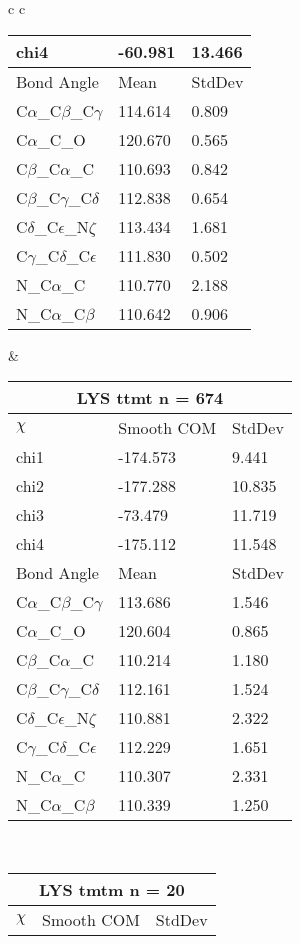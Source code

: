 \begin{longtable}{ c c }
\begin{tabular}{ l l l }
  chi4 & -60.981 & 13.466 \\ \midrule
  Bond Angle   & Mean     & StdDev \\ \midrule
  C$\alpha$\_C$\beta$\_C$\gamma$ & 114.614 & 0.809\\
  C$\alpha$\_C\_O & 120.670 & 0.565\\
  C$\beta$\_C$\alpha$\_C & 110.693 & 0.842\\
  C$\beta$\_C$\gamma$\_C$\delta$ & 112.838 & 0.654\\
  C$\delta$\_C$\epsilon$\_N$\zeta$ & 113.434 & 1.681\\
  C$\gamma$\_C$\delta$\_C$\epsilon$ & 111.830 & 0.502\\
  N\_C$\alpha$\_C & 110.770 & 2.188\\
  N\_C$\alpha$\_C$\beta$ & 110.642 & 0.906\\
  \bottomrule
  \end{tabular}
  &
  \begin{tabular}{ l l l }
  \toprule
  \multicolumn{3}{c}{LYS \textbf{ttmt} n = 674} \\ \toprule
  $\chi$       & Smooth COM & StdDev \\ \midrule
  chi1 & -174.573 & 9.441 \\ 
  chi2 & -177.288 & 10.835 \\ 
  chi3 & -73.479 & 11.719 \\ 
  chi4 & -175.112 & 11.548 \\ \midrule
  Bond Angle   & Mean     & StdDev \\ \midrule
  C$\alpha$\_C$\beta$\_C$\gamma$ & 113.686 & 1.546\\
  C$\alpha$\_C\_O & 120.604 & 0.865\\
  C$\beta$\_C$\alpha$\_C & 110.214 & 1.180\\
  C$\beta$\_C$\gamma$\_C$\delta$ & 112.161 & 1.524\\
  C$\delta$\_C$\epsilon$\_N$\zeta$ & 110.881 & 2.322\\
  C$\gamma$\_C$\delta$\_C$\epsilon$ & 112.229 & 1.651\\
  N\_C$\alpha$\_C & 110.307 & 2.331\\
  N\_C$\alpha$\_C$\beta$ & 110.339 & 1.250\\
  \bottomrule
  \end{tabular}
  \\
  \begin{tabular}{ l l l }
  \toprule
  \multicolumn{3}{c}{LYS \textbf{tmtm} n = 20} \\ \toprule
  $\chi$       & Smooth COM & StdDev \\ \midrule

\end{tabular}
\end{longtable}

